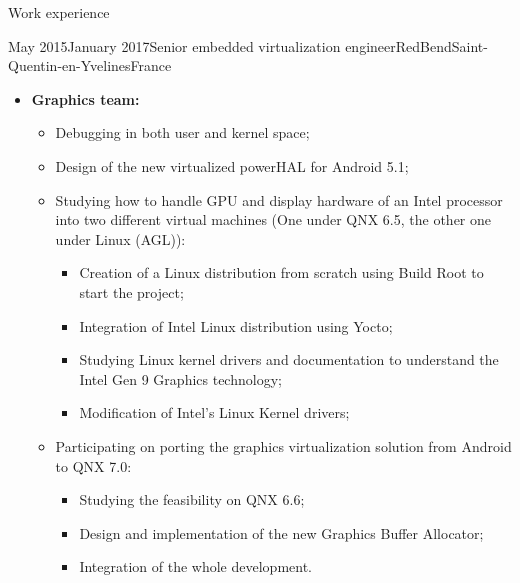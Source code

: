 \documentclass[a4paper, 10pt]{article}
\begin{document}
\begin{section} {Work experience}
    \begin{experience}{May 2015}{January 2017}{Senior embedded virtualization engineer}{RedBend}{Saint-Quentin-en-Yvelines}{France}
	\begin{subexperience}
	    \begin{itemize}[parsep=0cm,itemsep=0cm,topsep=0cm]
		\item \textbf {Graphics team:}
		\begin{itemize}[parsep=0cm,itemsep=0cm,topsep=0cm]
		    \item Debugging in both user and kernel space;
		    \item Design of the new virtualized powerHAL for Android 5.1;
		    \item Studying how to handle GPU and display hardware of an Intel processor into two different virtual machines (One under QNX 6.5, the other one under Linux (AGL)):
		    \begin{itemize}[parsep=0cm,itemsep=0cm,topsep=0cm]
			\item Creation of a Linux distribution from scratch using Build Root to start the project;
			\item Integration of Intel Linux distribution using Yocto;
			\item Studying Linux kernel drivers and documentation to understand the Intel Gen 9 Graphics technology;
			\item Modification of Intel's Linux Kernel drivers;
		    \end{itemize}
		    \item Participating on porting the graphics virtualization solution from Android to QNX 7.0:
		    \begin{itemize}[parsep=0cm,itemsep=0cm,topsep=0cm]
			\item Studying the feasibility on QNX 6.6;
			\item Design and implementation of the new Graphics Buffer Allocator;
			\item Integration of the whole development.
		    \end{itemize}
		\end{itemize}
	    \end{itemize}
	\end{subexperience}
    \end{experience}


\end{section}
\end{document}
